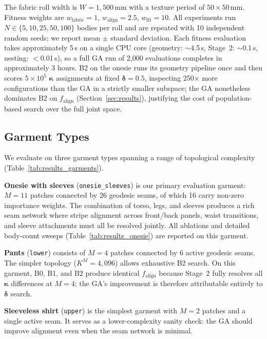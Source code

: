 The fabric roll width is $W = 1{,}500\,\text{mm}$ with a texture period of
$50 \times 50\,\text{mm}$.
Fitness weights are $w_\text{fabric} = 1$, $w_\text{align} = 2.5$, $w_\text{fit} = 10$.
All experiments run $N \in \{5, 10, 25, 50, 100\}$ bodies per roll and are
repeated with 10 independent random seeds; we report mean $\pm$ standard
deviation.
Each fitness evaluation takes approximately 5\,s on a single CPU core
(geometry: ${\sim}$4.5\,s, Stage~2: ${\sim}$0.1\,s, nesting: $<$0.01\,s),
so a full GA run of 2{,}000 evaluations completes in approximately
3 hours.
B2 on the onesie runs its geometry pipeline once and then scores
$5 \times 10^5$ $\boldsymbol{\kappa}$ assignments at fixed
$\boldsymbol{\delta} = 0.5$, inspecting 250$\times$ more configurations
than the GA in a strictly smaller subspace; the GA nonetheless
dominates B2 on $f_\text{align}$ (Section~\ref{sec:results}),
justifying the cost of population-based search over the full joint
space.

\subsection{Garment Types}
\label{sec:garments}

We evaluate on three garment types spanning a range of topological
complexity (Table~\ref{tab:results_garments}).

\textbf{Onesie with sleeves} (\texttt{onesie\_sleeves}) is our primary
evaluation garment: $M=11$ patches connected by 26 geodesic seams, of
which 16 carry non-zero importance weights.
The combination of torso, legs, and sleeves produces a rich seam network
where stripe alignment across front/back panels, waist transitions,
and sleeve attachments must all be resolved jointly.
All ablations and detailed body-count sweeps
(Table~\ref{tab:results_onesie}) are reported on this garment.

\textbf{Pants} (\texttt{lower}) consists of $M=4$ patches connected by
6 active geodesic seams.
The simpler topology ($K^M = 4{,}096$) allows exhaustive B2 search.
On this garment, B0, B1, and B2 produce identical $f_\text{align}$
because Stage~2 fully resolves all $\boldsymbol{\kappa}$ differences
at $M=4$; the GA's improvement is therefore attributable entirely to
$\boldsymbol{\delta}$ search.

\textbf{Sleeveless shirt} (\texttt{upper}) is the simplest garment
with $M=2$ patches and a single active seam.
It serves as a lower-complexity sanity check: the GA should improve
alignment even when the seam network is minimal.

